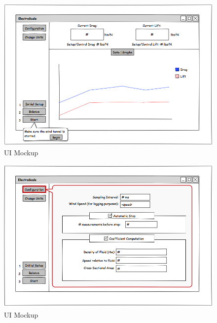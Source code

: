 		\begin{figure}[H]
			\centering
				\includegraphics[scale=0.40]{img/UI-PC-2}
			\caption{UI Mockup}
		\end{figure}

		\begin{figure}[H]
			\centering
				\includegraphics[scale=0.40]{img/UI-Configuration}
			\caption{UI Mockup}
		\end{figure}

